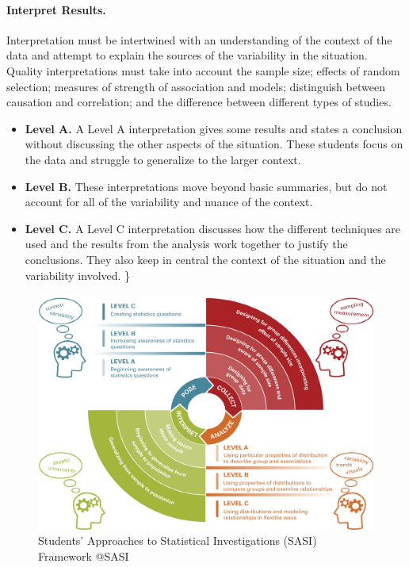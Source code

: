 \documentclass[
]{book}
\providecommand{\tightlist}{%
  \setlength{\itemsep}{0pt}\setlength{\parskip}{0pt}}
\theoremstyle{definition}
\theoremstyle{definition}
\theoremstyle{definition}
\theoremstyle{definition}
\theoremstyle{remark}
\begin{document}
\hypertarget{interpret-results.}{%
\paragraph*{Interpret Results.}\label{interpret-results.}}

Interpretation must be intertwined with an understanding of the context of the data and attempt to explain the sources of the variability in the situation. Quality interpretations must take into account the sample size; effects of random selection; measures of strength of association and models; distinguish between causation and correlation; and the difference between different types of studies.

\begin{itemize}
\tightlist
\item
  \textbf{Level A.} A Level A interpretation gives some results and states a conclusion without discussing the other aspects of the situation. These students focus on the data and struggle to generalize to the larger context.
\item
  \textbf{Level B.} These interpretations move beyond basic summaries, but do not account for all of the variability and nuance of the context.
\item
  \textbf{Level C.} A Level C interpretation discusses how the different techniques are used and the results from the analysis work together to justify the conclusions. They also keep in central the context of the situation and the variability involved.
  \}
\end{itemize}

\begin{figure}

{\centering \includegraphics[width=0.9\linewidth]{images/SASIFramework} 

}

\caption{Students' Approaches to Statistical Investigations (SASI) Framework @SASI}\label{fig:sasi}
\end{figure}
\end{document}
